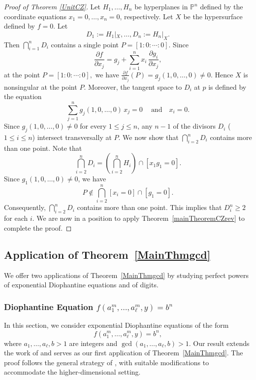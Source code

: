 \documentclass[10pt]{amsart}
\numberwithin{equation}{section}
\theoremstyle{plain}
\theoremstyle{definition}
\begin{document}
\begin{proof}[Proof of Theorem \ref{UnitCZ}]
Let $H_1,\ldots,H_n$ be hyperplanes in $\mathbb{P}^{n}$ defined by the coordinate equations 
$x_1=0,\ldots,x_n=0$, respectively. Let $X$ be the hypersurface defined by $f=0$.  Let
\[
D_1:=H_1|_X,\ldots,D_n:=H_n|_X.
\]
Then $\bigcap_{i=1}^{n }D_i$ contains a single point $P=[1:0:\cdots:0].$ Since 
\[
 \frac{\partial f}{\partial x_j} 
= g_j+\sum_{i=1}^n x_i\,\frac{\partial g_i}{\partial x_j},
\]
at the point
$P=[1:0:\cdots:0],$ we have
$\frac{\partial f}{\partial x_j}(P)=g_j(1,0,\dots,0) \neq 0.$   Hence $X$ is nonsingular at the point $P$. Moreover, the tangent space to $D_i$ at $p$ is defined by the equation 
\[
\sum_{j=1}^n g_j(1,0,\dots,0)\, x_j=0 \ \quad\text{and} \quad  x_i=0.
\]
Since $g_j(1,0,\dots,0)\neq 0$ for every $1\le j\le n$, any $n-1$ of the divisors $D_i$ ($1\le i\le n$) intersect transversally at $P$.
We now show that $\bigcap_{i=2}^n D_i$
contains more than one point. Note that
\[
\bigcap_{i=2}^n D_i
=
\left(\bigcap_{i=2}^n  H_i\right)\cap [x_1g_1=0].
\]
Since $g_1(1,0,\dots,0)\neq 0$, we have
\[
P \notin \bigcap_{i=2}^n [x_i=0]\cap [g_1=0].
\]
 Consequently, $\bigcap_{i=2}^n D_i$ contains more than one point. 
This implies that $D_i^n \ge 2$ for each $i$. 
We are now in a position to apply Theorem~\ref{mainTheoremCZrev} to complete the proof.

\end{proof}



\subsection{Application of Theorem~\ref{MainThmgcd}}\label{applyGCD}
We offer two applications of Theorem~\ref{MainThmgcd} by studying perfect powers of exponential Diophantine equations and of digits.


\subsubsection{\bf Diophantine Equation $f(a_1^{m},\hdots,  a_{\ell}^{m},y)=b^n$}\label{applyGCDdiop}
 In this section, we consider exponential Diophantine equations of the form
\[
f(a_1^{m},\ldots,a_{\ell}^{m},y)=b^n,
\]
where $a_1,\ldots,a_{\ell},b>1$ are integers and $\gcd(a_1,\ldots,a_{\ell},b) > 1$. Our result extends the work of \cite[Theorem 5.7]{HLX} and serves as  our first application of Theorem~\ref{MainThmgcd}. The proof follows the general strategy of \cite{HLX}, with suitable modifications to accommodate the higher-dimensional setting.
\end{document}
